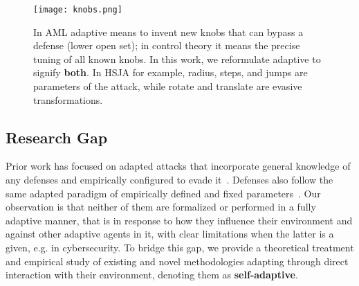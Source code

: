 \begin{figure}
    \centering
    \texttt{[image: knobs.png]}
    \caption{In \gls{AML} adaptive means to invent new knobs that can bypass a defense (lower open set); in control theory it means the precise tuning of all known knobs. In this work, we reformulate adaptive to signify \textbf{both}. In HSJA for example, radius, steps, and jumps are parameters of the attack, while rotate and translate are evasive transformations.}
    \label{fig:adaptivity}
\end{figure}

\subsection{Research Gap}
Prior work has focused on adapted attacks that incorporate general knowledge of any defenses and empirically configured to evade it~\cite{carlini2017towards, chen2020hopskipjumpattack, brendel2018decision}.
Defenses also follow the same adapted paradigm of empirically defined and fixed parameters~\cite{chen2020stateful, li2022blacklight}.
Our observation is that neither of them are formalized or performed in a fully adaptive manner, that is in response to how they influence their environment and against other adaptive agents in it, with clear limitations when the latter is a given, e.g. in cybersecurity.
To bridge this gap, we provide a theoretical treatment and empirical study of existing and novel methodologies adapting through direct interaction with their environment, denoting them as \textbf{self-adaptive}.

